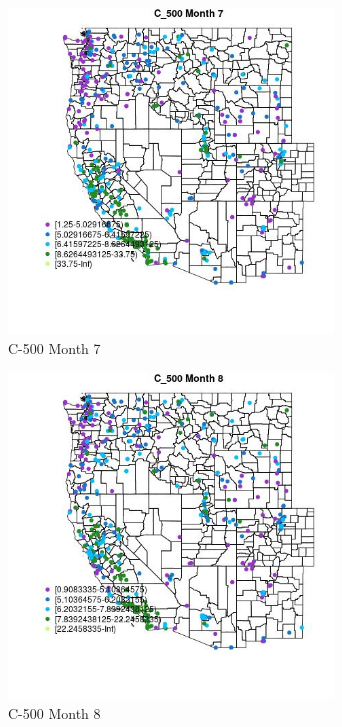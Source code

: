 \begin{figure} 
\centering  
\includegraphics[width=0.77\textwidth]{Code_Outputs/ML_input_report_ML_input_PM25_Step5_part_d_de_duplicated_aves_ML_input_MapObsMo7C_500.jpg} 
\caption{\label{fig:ML_input_report_ML_input_PM25_Step5_part_d_de_duplicated_aves_ML_inputMapObsMo7C_500}C-500 Month 7} 
\end{figure} 
 

\begin{figure} 
\centering  
\includegraphics[width=0.77\textwidth]{Code_Outputs/ML_input_report_ML_input_PM25_Step5_part_d_de_duplicated_aves_ML_input_MapObsMo8C_500.jpg} 
\caption{\label{fig:ML_input_report_ML_input_PM25_Step5_part_d_de_duplicated_aves_ML_inputMapObsMo8C_500}C-500 Month 8} 
\end{figure} 
 


